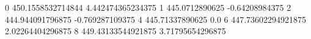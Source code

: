 0 450.1558532714844 4.442474365234375
1 445.0712890625 -0.64208984375
2 444.944091796875 -0.769287109375
4 445.71337890625 0.0
6 447.73602294921875 2.02264404296875
8 449.43133544921875 3.71795654296875
